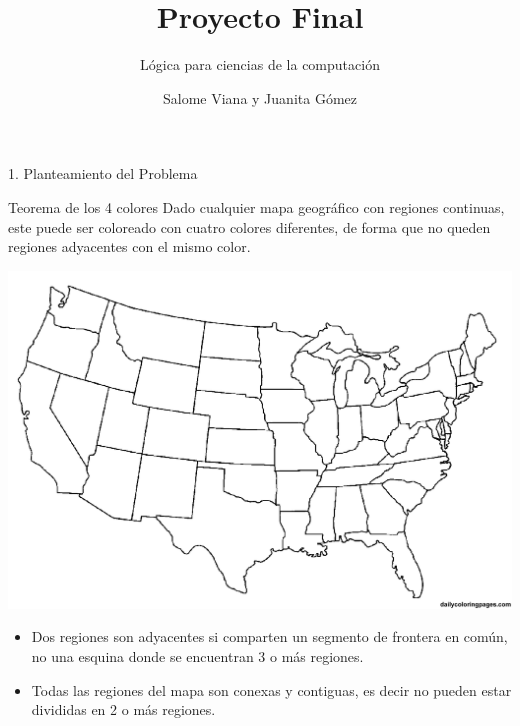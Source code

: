 \documentclass[10pt]{beamer}
\title{Proyecto Final }
\subtitle{Lógica para ciencias de la computación}
\author{Salome Viana y Juanita Gómez}
\begin{document}
{\1
\begin{frame}
  \titlepage 
\end{frame}}
\begin{frame}{1. Planteamiento del Problema}
\begin{block}{Teorema de los 4 colores}
Dado cualquier mapa geográfico con regiones continuas, este puede ser coloreado con cuatro colores diferentes, de forma que no queden regiones adyacentes con el mismo color.
\end{block}
\begin{multicols}{2}
\includegraphics[scale=0.105]{Images/Mapa1.png}
\begin{itemize}
\item Dos regiones son adyacentes si comparten un segmento de frontera en común, no una esquina donde se encuentran 3 o más regiones.
\item Todas las regiones del mapa son conexas y contiguas, es decir no pueden estar divididas en 2 o más regiones.
\end{itemize}
\end{multicols}
\end{frame}
\end{document}
